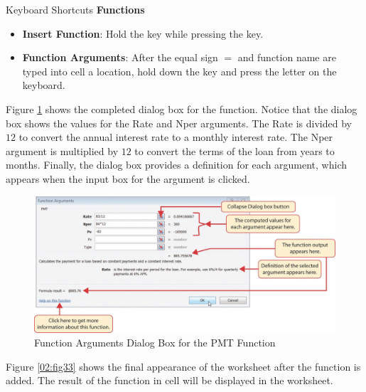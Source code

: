 \begin{center}
	\begin{shtcutbox}{Keyboard Shortcuts}
		\textbf{Functions}
		\\
		\begin{itemize}
			\setlength{\itemsep}{0pt}
			\setlength{\parskip}{0pt}
			\setlength{\parsep}{0pt}
			
			\item \textbf{Insert Function}: Hold the  key while pressing the  key.
			\item \textbf{Function Arguments}: After the equal sign $ = $ and function name are typed into cell a location, hold down the  key and press the letter  on the keyboard.		
		\end{itemize}
	
	\end{shtcutbox}
\end{center}

Figure \ref{02:fig32} shows the completed  dialog box for the  function. Notice that the dialog box shows the values for the Rate and Nper arguments. The Rate is divided by $ 12 $ to convert the annual interest rate to a monthly interest rate. The Nper argument is multiplied by $ 12 $ to convert the terms of the loan from years to months. Finally, the dialog box provides a definition for each argument, which appears when the input box for the argument is clicked.

\begin{figure}[H]
	\centering
	\includegraphics[width=\maxwidth{.95\linewidth}]{gfx/ch02_fig32}
	\caption{Function Arguments Dialog Box for the PMT Function}
	\label{02:fig32}
\end{figure}

Figure \ref{02:fig33} shows the final appearance of the  worksheet after the  function is added. The result of the function in cell  will be displayed in the  worksheet.

